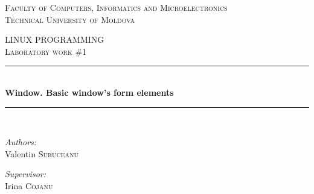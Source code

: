 \documentclass[11pt]{article}
\begin{document}
		\begin{center}
		
			\textsc{\large Faculty of Computers, Informatics and Microelectronics}\\[0.5cm]	
			\textsc{\large Technical University of Moldova}\\[1.2cm]
			\vspace{22mm}
			
			\textsc{\Large LINUX PROGRAMMING}\\[0.5cm]
			\textsc{\large Laboratory work \#1} \\[0.5cm]
			
			\newcommand{\KRule}{\rule{\linewidth}{0.5mm}}
			
			\vspace{10mm}
			\KRule \\[0.4cm]
			{\Large \bfseries Window. Basic window's form elements }\\[0.4cm]
			\KRule \\[1.5cm]
			
			\vspace{30mm}
			\begin{minipage}{0.4\textwidth}
				\begin{flushleft}
					\emph{Authors:}\\
					Valentin \textsc{Suruceanu}
				\end{flushleft}
			\end{minipage}
			\begin{minipage}{0.4\textwidth}
				\begin{flushright}
					\emph{Supervisor:}\\
					Irina \textsc{Cojanu}
				\end{flushright}
			\end{minipage}\\[4cm]
			\vspace{5mm}
			\vfill							
		\end{center}
	
\end{document}
